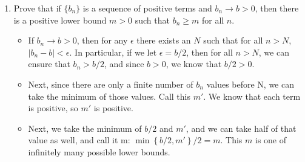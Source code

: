 \documentclass{article}
\begin{document}
\begin{enumerate}
\begin{enumerate}
        
    \end{enumerate}
                \newpage
            \item Prove that if $\{b_n\}$ is a sequence of positive terms and $b_n \rightarrow b > 0$, then there is a positive lower bound $m > 0$ such that $b_n \geq m$ for all $n$.
\begin{itemize}
    \item If $b_n \rightarrow b > 0$, then for any $\epsilon$ there exists an $N$ such that for all $n > N$, $|b_n - b| < \epsilon$. In particular, if we let $\epsilon = b/2$, then for all $n > N$, we can ensure that $b_n > b/2$, and since $b > 0$, we know that $b/2 > 0$. 
    \item Next, since there are only a finite number of $b_n$ values before N, we can take the minimum of those values. Call this $m'$.  We know that each term is positive, so $m'$ is positive.
    \item Next, we take the minimum of $b/2$ and $m'$, and we can take half of that value as well, and call it m: $\min  \left\{b/2,m'\right\}/2 = m$. This $m$ is one of infinitely many possible lower bounds.
\end{itemize}
\end{enumerate}
\end{document}
